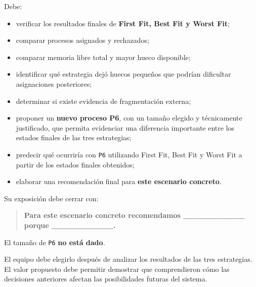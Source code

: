 \documentclass[
  spanish,
  letterpaper,
]{scrbook}
\providecommand{\tightlist}{%
  \setlength{\itemsep}{0pt}\setlength{\parskip}{0pt}}
\begin{document}
Debe:

\begin{itemize}
\tightlist
\item
  verificar los resultados finales de \textbf{First Fit, Best Fit y
  Worst Fit};
\item
  comparar procesos asignados y rechazados;
\item
  comparar memoria libre total y mayor hueco disponible;
\item
  identificar qué estrategia dejó huecos pequeños que podrían dificultar
  asignaciones posteriores;
\item
  determinar si existe evidencia de fragmentación externa;
\item
  proponer un \textbf{nuevo proceso P6}, con un tamaño elegido y
  técnicamente justificado, que permita evidenciar una diferencia
  importante entre los estados finales de las tres estrategias;
\item
  predecir qué ocurriría con \texttt{P6} utilizando First Fit, Best Fit
  y Worst Fit a partir de los estados finales obtenidos;
\item
  elaborar una recomendación final para \textbf{este escenario
  concreto}.
\end{itemize}

Su exposición debe cerrar con:

\begin{quote}
\textbf{Para este escenario concreto recomendamos \_\_\_\_\_\_\_\_\_\_
porque \_\_\_\_\_\_\_\_\_\_.}
\end{quote}

\begin{tcolorbox}[enhanced jigsaw, arc=.35mm, bottomrule=.15mm, bottomtitle=1mm, breakable, colback=white, colbacktitle=quarto-callout-tip-color!10!white, colframe=quarto-callout-tip-color-frame, coltitle=black, left=2mm, leftrule=.75mm, opacityback=0, opacitybacktitle=0.6, rightrule=.15mm, title=\textcolor{quarto-callout-tip-color}{\faLightbulb}\hspace{0.5em}{El reto del Equipo 6}, titlerule=0mm, toprule=.15mm, toptitle=1mm]

El tamaño de \texttt{P6} \textbf{no está dado}.

El equipo debe elegirlo después de analizar los resultados de las tres
estrategias. El valor propuesto debe permitir demostrar que
comprendieron cómo las decisiones anteriores afectan las posibilidades
futuras del sistema.

\end{tcolorbox}
\end{document}
